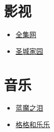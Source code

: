
\section{影视}
\begin{itemize}
	\item \href{http://www.dyxia.com/}{全集网}
	\item \href{http://www.cnscg.org/sort-15.html}{圣城家园}
\end{itemize}
\section{音乐}
\begin{itemize}
	\item \href{http://blog.sina.com.cn/s/articlelist_1713824081_0_1.html}{蓝魔之泪}
	\item \href{http://ggelle.05.binghe88.com/}{格格和乐乐}
\end{itemize}